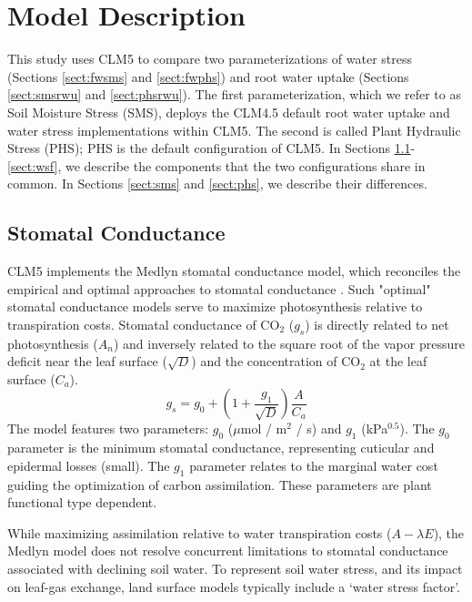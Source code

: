 \documentclass[draft,linenumbers]{agujournal}
\begin{document}
\section{Model Description}
This study uses CLM5 to compare two parameterizations of water stress (Sections \ref{sect:fwsms} and \ref{sect:fwphs}) and root water uptake (Sections \ref{sect:smsrwu} and \ref{sect:phsrwu}). The first parameterization, which we refer to as Soil Moisture Stress (SMS), deploys the CLM4.5 default root water uptake and water stress implementations within CLM5. The second is called Plant Hydraulic Stress (PHS); PHS is the default configuration of CLM5. In Sections \ref{sect:gs}-\ref{sect:wsf}, we describe the components that the two configurations share in common. In Sections \ref{sect:sms} and \ref{sect:phs}, we describe their differences.
    
    
\subsection{Stomatal Conductance}
\label{sect:gs}
    CLM5 implements the Medlyn stomatal conductance model, which reconciles the empirical and optimal approaches to 
    stomatal conductance \citep{medlyn2011}.
    Such "optimal" stomatal conductance models serve to maximize photosynthesis relative to transpiration costs. 
    Stomatal conductance of CO$_2$ ($g_s$) is directly related to net photosynthesis ($A_n$) 
    and inversely related to the square root of the vapor pressure deficit near the leaf surface ($\sqrt{D}$) and the concentration of CO$_2$ at the leaf surface ($C_a$).
    \begin{equation}
    g_s=g_0+\left(1+\dfrac{g_1}{\sqrt{D}}\right)\dfrac{A}{C_a}
    \end{equation}
    The model features two parameters: $g_0$ ($\mu$mol / m$^2$ / s) and $g_1$ (kPa$^{0.5}$). 
    The $g_0$ parameter is the minimum stomatal conductance, representing cuticular and epidermal losses (small). 
    The $g_1$ parameter relates to the marginal water cost guiding the optimization of carbon assimilation. 
    These parameters are plant functional type dependent.
    
    While maximizing assimilation relative to water transpiration costs ($A-\lambda E$), the Medlyn model does not 
    resolve concurrent limitations to stomatal conductance associated with declining soil water. 
    To represent soil water stress, and its impact on leaf-gas exchange, land surface models typically include a `water stress factor'. 
\end{document}
